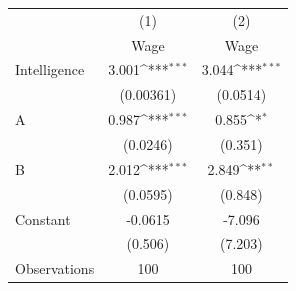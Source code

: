 {
\def\sym#1{\ifmmode^{#1}\else\(^{#1}\)\fi}
\begin{tabular}{l*{2}{c}}
\toprule
                    &\multicolumn{1}{c}{(1)}&\multicolumn{1}{c}{(2)}\\
                    &\multicolumn{1}{c}{Wage}&\multicolumn{1}{c}{Wage}\\
\midrule
Intelligence        &       3.001\sym{***}&       3.044\sym{***}\\
                    &   (0.00361)         &    (0.0514)         \\
\addlinespace
A                   &       0.987\sym{***}&       0.855\sym{*}  \\
                    &    (0.0246)         &     (0.351)         \\
\addlinespace
B                   &       2.012\sym{***}&       2.849\sym{**} \\
                    &    (0.0595)         &     (0.848)         \\
\addlinespace
Constant            &     -0.0615         &      -7.096         \\
                    &     (0.506)         &     (7.203)         \\
\midrule
Observations        &         100         &         100         \\
\bottomrule
\end{tabular}
}
